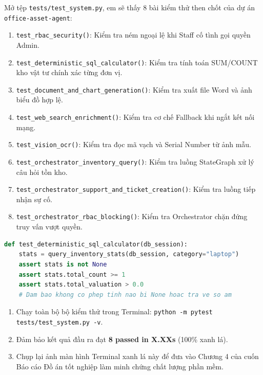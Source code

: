 \begin{codeautopsybox}
Mở tệp \texttt{tests/test\_system.py}, em sẽ thấy 8 bài kiểm thử then chốt của dự án \texttt{office-asset-agent}:
\begin{enumerate}[leftmargin=1.5em]
    \item \texttt{test\_rbac\_security()}: Kiểm tra ném ngoại lệ khi Staff cố tình gọi quyền Admin.
    \item \texttt{test\_deterministic\_sql\_calculator()}: Kiểm tra tính toán SUM/COUNT kho vật tư chính xác từng đơn vị.
    \item \texttt{test\_document\_and\_chart\_generation()}: Kiểm tra xuất file Word và ảnh biểu đồ hợp lệ.
    \item \texttt{test\_web\_search\_enrichment()}: Kiểm tra cơ chế Fallback khi ngắt kết nối mạng.
    \item \texttt{test\_vision\_ocr()}: Kiểm tra đọc mã vạch và Serial Number từ ảnh mẫu.
    \item \texttt{test\_orchestrator\_inventory\_query()}: Kiểm tra luồng StateGraph xử lý câu hỏi tồn kho.
    \item \texttt{test\_orchestrator\_support\_and\_ticket\_creation()}: Kiểm tra luồng tiếp nhận sự cố.
    \item \texttt{test\_orchestrator\_rbac\_blocking()}: Kiểm tra Orchestrator chặn đứng truy vấn vượt quyền.
\end{enumerate}
\begin{lstlisting}[language=Python]
def test_deterministic_sql_calculator(db_session):
    stats = query_inventory_stats(db_session, category="laptop")
    assert stats is not None
    assert stats.total_count >= 1
    assert stats.total_valuation > 0.0
    # Dam bao khong co phep tinh nao bi None hoac tra ve so am
\end{lstlisting}
\end{codeautopsybox}

\begin{labmilestonebox}
\begin{enumerate}[leftmargin=1.5em]
    \item Chạy toàn bộ bộ kiểm thử trong Terminal: \texttt{python -m pytest tests/test\_system.py -v}.
    \item Đảm bảo kết quả đầu ra đạt \textbf{8 passed in X.XXs} (100\% xanh lá).
    \item Chụp lại ảnh màn hình Terminal xanh lá này để đưa vào Chương 4 của cuốn Báo cáo Đồ án tốt nghiệp làm minh chứng chất lượng phần mềm.
\end{enumerate}
\end{labmilestonebox}

